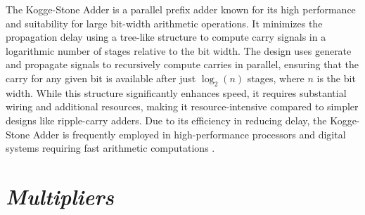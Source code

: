 The Kogge-Stone Adder is a parallel prefix adder known for its high performance and suitability for large bit-width arithmetic operations. It minimizes the propagation delay using a tree-like structure to compute carry signals in a logarithmic number of stages relative to the bit width. The design uses generate and propagate signals to recursively compute carries in parallel, ensuring that the carry for any given bit is available after just $\log_2(n)$ stages, where $n$ is the bit width. While this structure significantly enhances speed, it requires substantial wiring and additional resources, making it resource-intensive compared to simpler designs like ripple-carry adders. Due to its efficiency in reducing delay, the Kogge-Stone Adder is frequently employed in high-performance processors and digital systems requiring fast arithmetic computations  \cite{kogge1973parallel}.

\section{{\bf {\em Multipliers}}}
